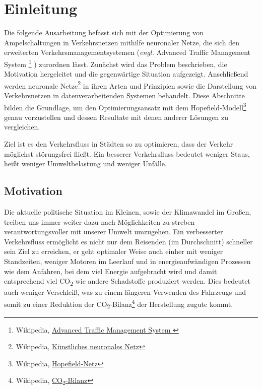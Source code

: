 \section{Einleitung}

Die folgende Ausarbeitung befasst sich mit der Optimierung von Ampelschaltungen in Verkehrsnetzen mithilfe neuronaler Netze, die sich den erweiterten Verkehrsmanagementsystemen (\textit{engl.} Advanced Traffic Management System
\footnote{
Wikipedia, \href{
https://en.wikipedia.org/wiki/Advanced\_Traffic\_Management\_System
}{
Advanced Traffic Management System
}
}
)
zurordnen lässt. Zunächst wird das Problem beschrieben, die Motivation hergeleitet und die gegenwärtige Situation aufgezeigt. Anschließend werden neuronale Netze\footnote{Wikipedia, \href{https://de.wikipedia.org/wiki/K\%C3\%BCnstliches\_neuronales\_Netz}{Künstliches neuronales Netz}} in ihren Arten und Prinzipien sowie die Darstellung von Verkehrsnetzen in datenverarbeitenden Systemen behandelt. Diese Abschnitte bilden die Grundlage, um den Optimierungsansatz mit dem Hopefield-Modell\footnote{Wikipedia, \href{https://de.wikipedia.org/wiki/Hopfield-Netz}{Hopefield-Netz}} genau vorzustellen und dessen Resultate mit denen anderer Lösungen zu vergleichen.

Ziel ist es den Verkehrsfluss in Städten so zu optimieren, dass der Verkehr möglichst störungsfrei fließt. Ein besserer Verkehrsfluss bedeutet weniger Staus, heißt weniger Umweltbelastung und weniger Unfälle.

\subsection{Motivation}

Die aktuelle politische Situation im Kleinen, sowie der Klimawandel im Großen, treiben uns immer weiter dazu nach Möglichkeiten zu streben verantwortungsvoller mit unserer Umwelt umzugehen. Ein verbesserter Verkehrsfluss ermöglicht es nicht nur dem Reisenden (im Durchschnitt) schneller sein Ziel zu erreichen, er geht optimaler Weise auch einher mit weniger Standzeiten, weniger Motoren im Leerlauf und in energieaufwändigen Prozessen wie dem Anfahren, bei dem viel Energie aufgebracht wird und damit entsprechend viel CO\textsubscript{2} wie andere Schadstoffe produziert werden. Dies bedeutet auch weniger Verschleiß, was zu einem längeren Verwenden des Fahrzeugs und somit zu einer Reduktion der CO\textsubscript{2}-Bilanz\footnote{Wikipedia, \href{https://de.wikipedia.org/wiki/CO2-Bilanz}{CO\textsubscript{2}-Bilanz}} der Herstellung zugute kommt.

